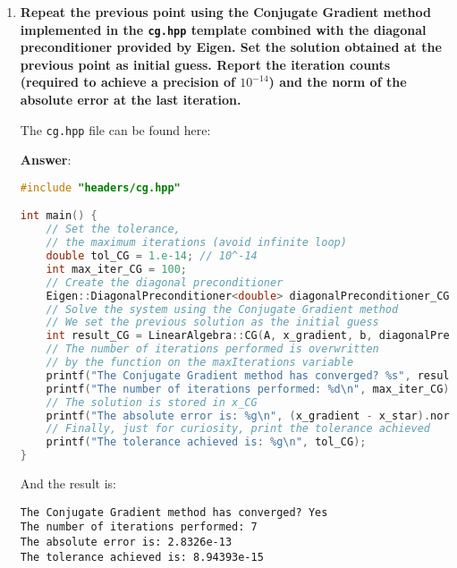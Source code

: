 \begin{enumerate}[label=\textcolor{Green3}{\textbf{\arabic*.}}]
    \item \textcolor{Green3}{\textbf{%
        Repeat the previous point using the Conjugate Gradient method implemented in the \texttt{cg.hpp} template combined with the diagonal preconditioner provided by Eigen. Set the solution obtained at the previous point as initial guess. Report the iteration counts (required to achieve a precision of $10^{-14}$) and the norm of the absolute error at the last iteration.
    }}

    The \texttt{cg.hpp} file can be found here:
    \begin{center}
    \end{center}

    \textbf{Answer}:
    \begin{lstlisting}[language=C++]
#include "headers/cg.hpp"

int main() {
    // Set the tolerance,
    // the maximum iterations (avoid infinite loop)
    double tol_CG = 1.e-14; // 10^-14
    int max_iter_CG = 100;
    // Create the diagonal preconditioner
    Eigen::DiagonalPreconditioner<double> diagonalPreconditioner_CG(A);
    // Solve the system using the Conjugate Gradient method
    // We set the previous solution as the initial guess
    int result_CG = LinearAlgebra::CG(A, x_gradient, b, diagonalPreconditioner_CG, max_iter_CG, tol_CG);
    // The number of iterations performed is overwritten
    // by the function on the maxIterations variable
    printf("The Conjugate Gradient method has converged? %s", result_CG ? "No\n" : "Yes\n");
    printf("The number of iterations performed: %d\n", max_iter_CG);
    // The solution is stored in x_CG
    printf("The absolute error is: %g\n", (x_gradient - x_star).norm());
    // Finally, just for curiosity, print the tolerance achieved
    printf("The tolerance achieved is: %g\n", tol_CG);
}\end{lstlisting}
    And the result is:
    \begin{lstlisting}
The Conjugate Gradient method has converged? Yes
The number of iterations performed: 7
The absolute error is: 2.8326e-13
The tolerance achieved is: 8.94393e-15\end{lstlisting}
\end{enumerate}
